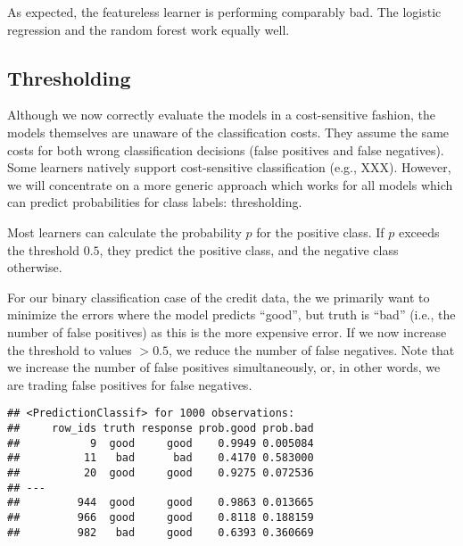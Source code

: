 \documentclass[
]{scrbook}
\newenvironment{Shaded}{\begin{snugshade}}{\end{snugshade}}
\newcommand{\AttributeTok}[1]{\textcolor[rgb]{0.77,0.63,0.00}{#1}}
\newcommand{\CommentTok}[1]{\textcolor[rgb]{0.56,0.35,0.01}{\textit{#1}}}
\newcommand{\FunctionTok}[1]{\textcolor[rgb]{0.00,0.00,0.00}{#1}}
\newcommand{\NormalTok}[1]{#1}
\newcommand{\OtherTok}[1]{\textcolor[rgb]{0.56,0.35,0.01}{#1}}
\newcommand{\SpecialCharTok}[1]{\textcolor[rgb]{0.00,0.00,0.00}{#1}}
\newcommand{\StringTok}[1]{\textcolor[rgb]{0.31,0.60,0.02}{#1}}
\renewenvironment{Shaded} {\begin{snugshade}\small} {\end{snugshade}}
\begin{document}
As expected, the featureless learner is performing comparably bad.
The logistic regression and the random forest work equally well.

\hypertarget{thresholding-1}{%
\subsection{Thresholding}\label{thresholding-1}}

Although we now correctly evaluate the models in a cost-sensitive fashion, the models themselves are unaware of the classification costs.
They assume the same costs for both wrong classification decisions (false positives and false negatives).
Some learners natively support cost-sensitive classification (e.g., XXX).
However, we will concentrate on a more generic approach which works for all models which can predict probabilities for class labels: thresholding.

Most learners can calculate the probability \(p\) for the positive class.
If \(p\) exceeds the threshold \(0.5\), they predict the positive class, and the negative class otherwise.

For our binary classification case of the credit data, the we primarily want to minimize the errors where the model predicts ``good'', but truth is ``bad'' (i.e., the number of false positives) as this is the more expensive error.
If we now increase the threshold to values \(> 0.5\), we reduce the number of false negatives.
Note that we increase the number of false positives simultaneously, or, in other words, we are trading false positives for false negatives.

\begin{Shaded}
\end{Shaded}

\begin{verbatim}
## <PredictionClassif> for 1000 observations:
##     row_ids truth response prob.good prob.bad
##           9  good     good    0.9949 0.005084
##          11   bad      bad    0.4170 0.583000
##          20  good     good    0.9275 0.072536
## ---                                          
##         944  good     good    0.9863 0.013665
##         966  good     good    0.8118 0.188159
##         982   bad     good    0.6393 0.360669
\end{verbatim}
\end{document}
